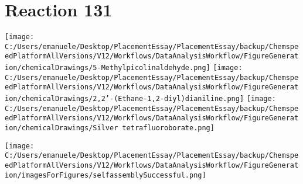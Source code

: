 \documentclass{article}%
\begin{document}
\section*{Reaction 131}%
%
\begin{scheme}[H]%
\begin{minipage}{0.5\textwidth}%
\texttt{[image: C:/Users/emanuele/Desktop/PlacementEssay/PlacementEssay/backup/ChemspeedPlatformAllVersions/V12/Workflows/DataAnalysisWorkflow/FigureGeneration/chemicalDrawings/5-Methylpicolinaldehyde.png]}%
\texttt{[image: C:/Users/emanuele/Desktop/PlacementEssay/PlacementEssay/backup/ChemspeedPlatformAllVersions/V12/Workflows/DataAnalysisWorkflow/FigureGeneration/chemicalDrawings/2,2'-(Ethane-1,2-diyl)dianiline.png]}%
\texttt{[image: C:/Users/emanuele/Desktop/PlacementEssay/PlacementEssay/backup/ChemspeedPlatformAllVersions/V12/Workflows/DataAnalysisWorkflow/FigureGeneration/chemicalDrawings/Silver tetrafluoroborate.png]}%
\end{minipage}%
\begin{minipage}{0.5\textwidth}%
\begin{center}%
\texttt{[image: C:/Users/emanuele/Desktop/PlacementEssay/PlacementEssay/backup/ChemspeedPlatformAllVersions/V12/Workflows/DataAnalysisWorkflow/FigureGeneration/imagesForFigures/selfassemblySuccessful.png]}%
\end{center}%
\end{minipage}%
\caption{Self-assembly of components 3, 20, with Silver(I) in a 3.0:1.5:1.0 molar ratio in CH$_3$CN at 60\textdegree C for 40h. These are the reagents (starting materials) for reaction 131.}%
\end{scheme}%
\end{document}
